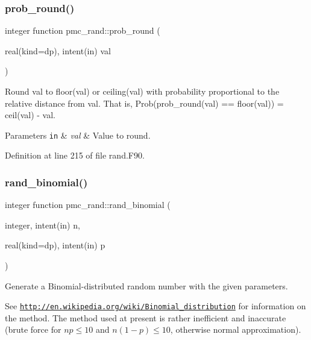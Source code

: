 \mbox{\label{namespacepmc__rand_aa92bb8693f9b8ef18c9e4ec820ada63b}} 
\subsubsection{\texorpdfstring{prob\+\_\+round()}{prob\_round()}}
{\footnotesize\ttfamily integer function pmc\+\_\+rand\+::prob\+\_\+round (\begin{DoxyParamCaption}\item[{real(kind=dp), intent(in)}]{val }\end{DoxyParamCaption})}



Round val to {\ttfamily floor(val)} or {\ttfamily ceiling(val)} with probability proportional to the relative distance from {\ttfamily val}. That is, Prob(prob\+\_\+round(val) == floor(val)) = ceil(val) -\/ val. 


\begin{DoxyParams}[1]{Parameters}
\mbox{\tt in}  & {\em val} & Value to round. \\
\hline
\end{DoxyParams}


Definition at line 215 of file rand.\+F90.

\mbox{\label{namespacepmc__rand_a4f8465fceab04e6f853f484509121fc1}} 
\subsubsection{\texorpdfstring{rand\+\_\+binomial()}{rand\_binomial()}}
{\footnotesize\ttfamily integer function pmc\+\_\+rand\+::rand\+\_\+binomial (\begin{DoxyParamCaption}\item[{integer, intent(in)}]{n,  }\item[{real(kind=dp), intent(in)}]{p }\end{DoxyParamCaption})}



Generate a Binomial-\/distributed random number with the given parameters. 

See \href{http://en.wikipedia.org/wiki/Binomial_distribution}{\tt http\+://en.\+wikipedia.\+org/wiki/\+Binomial\+\_\+distribution} for information on the method. The method used at present is rather inefficient and inaccurate (brute force for $np \le 10$ and $n(1-p) \le 10$, otherwise normal approximation).

